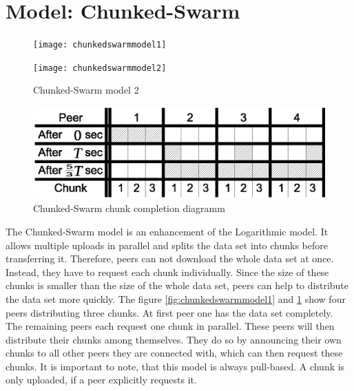 \section{Model: Chunked-Swarm}
\label{theory:model:chunkedswarm}

\begin{figure} [ht]
	\centering
	\begin{minipage}[b]{0.4\linewidth}
		\centering
		\texttt{[image: chunkedswarmmodel1]}
		\caption{Chunked-Swarm model 1}
		\label{fig:chunkedswarmmodel1}
	\end{minipage}
	\hspace{0.1\linewidth}
	\begin{minipage}[b]{0.4\linewidth}
		\centering
		\texttt{[image: chunkedswarmmodel2]}
		\caption{Chunked-Swarm model 2}
		\label{fig:chunkedswarmmodel2}
	\end{minipage}
\end{figure}

\begin{figure}[ht]
	\centering
	\includegraphics[width=0.8\linewidth]{chunkedswarmformula1}
	\caption{Chunked-Swarm chunk completion diagramm}
	\label{fig:chunkedswarmformula1}
\end{figure}

The Chunked-Swarm model is an enhancement of the Logarithmic model. It allows multiple uploads in parallel and splits the data set into chunks before transferring it. Therefore, peers can not download the whole data set at once. Instead, they have to request each chunk individually. Since the size of these chunks is smaller than the size of the whole data set, peers can help to distribute the data set more quickly. The figure \ref{fig:chunkedswarmmodel1} and \ref{fig:chunkedswarmmodel2} show four peers distributing three chunks. At first peer one has the data set completely. The remaining peers each request one chunk in parallel. These peers will then distribute their chunks among themselves. They do so by announcing their own chunks to all other peers they are connected with, which can then request these chunks. It is important to note, that this model is always pull-based. A chunk is only uploaded, if a peer explicitly requests it.

